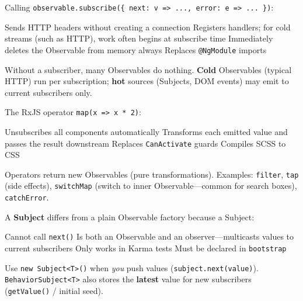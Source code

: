 \question[4]
Calling \lstinline[style=tsinline]|observable.subscribe({ next: v => ..., error: e => ... })|:
\begin{choices}
  \choice Sends HTTP headers without creating a connection
  \CorrectChoice Registers handlers; for cold streams (such as HTTP), work often begins at subscribe time
  \choice Immediately deletes the Observable from memory always
  \choice Replaces \lstinline[style=tsinline]|@NgModule| imports
\end{choices}
\begin{solution}
  Without a subscriber, many Observables do nothing. \textbf{Cold} Observables (typical HTTP) run per subscription; \textbf{hot} sources (Subjects, DOM events) may emit to current subscribers only.
\end{solution}

\question[4]
The RxJS operator \lstinline[style=tsinline]|map(x => x * 2)|:
\begin{choices}
  \choice Unsubscribes all components automatically
  \CorrectChoice Transforms each emitted value and passes the result downstream
  \choice Replaces \lstinline[style=tsinline]|CanActivate| guards
  \choice Compiles SCSS to CSS
\end{choices}
\begin{solution}
  Operators return new Observables (pure transformations). Examples: \lstinline[style=tsinline]|filter|, \lstinline[style=tsinline]|tap| (side effects), \lstinline[style=tsinline]|switchMap| (switch to inner Observable---common for search boxes), \lstinline[style=tsinline]|catchError|.
\end{solution}

\question[4]
A \textbf{Subject} differs from a plain Observable factory because a Subject:
\begin{choices}
  \choice Cannot call \lstinline[style=tsinline]|next()|
  \CorrectChoice Is both an Observable and an observer---multicasts values to current subscribers
  \choice Only works in Karma tests
  \choice Must be declared in \texttt{bootstrap}
\end{choices}
\begin{solution}
  Use \lstinline[style=tsinline]|new Subject<T>()| when \emph{you} push values (\lstinline[style=tsinline]|subject.next(value)|). \lstinline[style=tsinline]|BehaviorSubject<T>| also stores the \textbf{latest} value for new subscribers (\lstinline[style=tsinline]|getValue()| / initial seed).
\end{solution}

